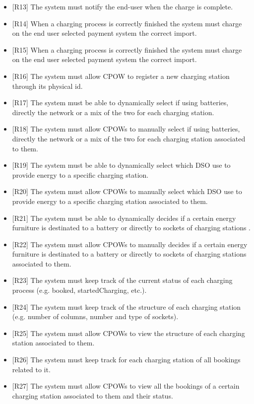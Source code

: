 \documentclass[a4paper]{report}
\begin{document}
\begin{itemize}
    \item{[R13]} \label{R13} The system must notify the end-user when the charge is complete.
    \item{[R14]} \label{R14} When a charging process is correctly finished the system must charge on the end user selected payment system the correct import.
    \item{[R15]} \label{R15} When a charging process is correctly finished the system must charge on the end user selected payment system the correct import.
    \item{[R16]} \label{R16} The system must allow CPOW to register a new charging station through its physical id.
    \item{[R17]} \label{R17} The system must be able to dynamically select if using batteries, directly the network or a mix of the two for each charging station. 
    \item{[R18]} \label{R18} The system must allow CPOWs to manually select if using batteries, directly the network or a mix of the two for each charging station associated to them. 
    \item{[R19]} \label{R19} The system must be able to dynamically select which DSO use to provide energy to a specific charging station.
    \item{[R20]} \label{R20} The system must allow CPOWs to manually select which DSO use to provide energy to a specific charging station associated to them.
    \item{[R21]} \label{R21} The system must be able to dynamically decides if a certain energy furniture is destinated to a battery or directly to sockets of charging stations .
    \item{[R22]} \label{R22} The system must allow CPOWs to manually decides if a certain energy furniture is destinated to a battery or directly to sockets of charging stations associated to them.
    \item{[R23]} \label{R23} The system must keep track of the current status of each charging process (e.g. booked, startedCharging, etc.).
    \item{[R24]} \label{R24} The system must keep track of the structure of each charging station (e.g. number of columns, number and type of sockets).
    \item{[R25]} \label{R25} The system must allow CPOWs to view the structure of each charging station associated to them.
    \item{[R26]} \label{R26} The system must keep track for each charging station of all bookings related to it.
    \item{[R27]} \label{R27} The system must allow CPOWs to view all the bookings of a certain charging station associated to them and their status.
\end{itemize}
\end{document}
